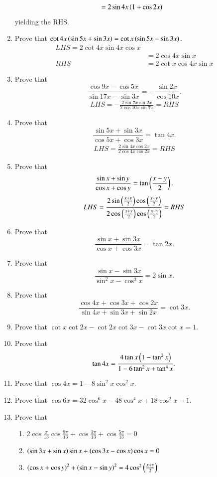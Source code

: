 \begin{enumerate}[label=\thesubsection.\arabic*,ref=\thesubsection.\theenumi,itemsep=1ex]
\begin{align}
	&=2\sin4x\left(1+\cos 2x\right) 
\end{align}
yielding the RHS.
\item Prove that
$\cot4x\left(\sin5x+\sin3x\right)= \cot x\left(\sin5x-\sin3x\right).$
%
\\
\solution  
\begin{align}
	LHS = 
2\cot4x\sin4x\cos x
\\
	&= 
2\cos4x\sin x
	\\
	RHS&=2\cot x\cos 4x \sin x
\end{align}
\item Prove that
$$\frac{\cos9x-\cos5x}{\sin17x-\sin3x}=-\frac{\sin2x}{\cos10x}.$$
%
\solution
\begin{align}
LHS = -\frac{2 \sin7x\sin 2x}{2\cos 10x\sin7x}
=RHS
\end{align}
\item Prove that
$$\frac{\sin5x+\sin3x}{\cos5x+\cos3x}=\tan4x.$$
%
\solution
\begin{align}
LHS = \frac{2\sin4x\cos 2x}{2\cos4x\cos2x}=RHS
\end{align}
\item Prove that
$$\frac{\sin x+\sin y}{\cos x+\cos y}=\tan\left(\frac{x-y}{2}\right).$$
%
\solution 
\begin{align}
LHS = \frac{2\sin \left(\frac{x+y}{2}\right)\cos\left(\frac{x-y}{2}\right)}{2\cos\left(\frac{x+y}{2}\right)\cos\left(\frac{x-y}{2}\right)}=RHS
\end{align}
\item Prove that
$$\frac{\sin x+\sin3x}{\cos x+\cos3x}=\tan2x.$$
%
\item Prove that
$$\frac{\sin x-\sin3x}{\sin^{2}x-\cos^{2}x}=2\sin x.$$
%
\item Prove that
$$\frac{\cos4x+\cos3x+\cos2x}{\sin4x+\sin3x+\sin2x}=\cot3x.$$
%
\item Prove that
$\cot x\cot2x-\cot2x\cot3x-\cot3x\cot x=1$.
%
\item Prove that
$$\tan4x=\frac{4\tan x\left(1-\tan^{2}x\right)}{1-6\tan^{2}x+\tan^{4}x}.$$
%
\item Prove that
$\cos4x=1-8\sin^{2}x\cos^{2}x$.
%
\item Prove that
$\cos6x=32\cos^{6}x-48\cos^{4}x+18\cos^{2}x-1$.
%
%
\item Prove that
\begin{enumerate}
\item 2$\cos\frac{\pi}{13}\cos\frac{9\pi}{13}+\cos\frac{3\pi}{13}+\cos\frac{5\pi}{13}=0$
\item $\left(\sin3x+\sin x\right)\sin x+\left(\cos3x-\cos x\right)\cos x=0$
\item $\left(\cos x+\cos y\right)^{2}+\left(\sin x-\sin y\right)^{2}=4\cos^{2}\left(\frac{x+y}{2}\right)$

\end{enumerate}
\end{enumerate}
